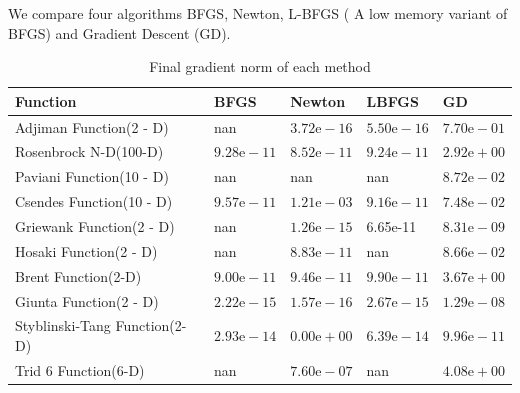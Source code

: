 \documentclass[12pt]{report}
\begin{document}
We compare four algorithms BFGS, Newton, L-BFGS ( A low memory variant of BFGS) and Gradient Descent (GD).
\begin{table}[htpb]
	\centering
	\caption{Final gradient norm of each method}
	\label{tab:label}
	\begin{tabular}{lllll}
		\toprule
		Function                      & BFGS                 & Newton               & LBFGS                & GD                   \\
		\midrule
		Adjiman Function(2 - D)       & nan                  & $3.72 \mathrm{e}-16$ & $5.50 \mathrm{e}-16$ & $7.70 \mathrm{e}-01$ \\
		Rosenbrock N-D(100-D)         & $9.28 \mathrm{e}-11$ & $8.52 \mathrm{e}-11$ & $9.24 \mathrm{e}-11$ & $2.92 \mathrm{e}+00$ \\
		Paviani Function(10 - D)      & nan                  & nan                  & nan                  & $8.72 \mathrm{e}-02$ \\
		Csendes Function(10 - D)      & $9.57 \mathrm{e}-11$ & $1.21 \mathrm{e}-03$ & $9.16 \mathrm{e}-11$ & $7.48 \mathrm{e}-02$ \\
		Griewank Function(2 - D)      & nan                  & $1.26 \mathrm{e}-15$ & 6.65e-11             & $8.31 \mathrm{e}-09$ \\
		Hosaki Function(2 - D)        & nan                  & $8.83 \mathrm{e}-11$ & nan                  & $8.66 \mathrm{e}-02$ \\
		Brent Function(2-D)           & $9.00 \mathrm{e}-11$ & $9.46 \mathrm{e}-11$ & $9.90 \mathrm{e}-11$ & $3.67 \mathrm{e}+00$ \\
		Giunta Function(2 - D)        & $2.22 \mathrm{e}-15$ & $1.57 \mathrm{e}-16$ & $2.67 \mathrm{e}-15$ & $1.29 \mathrm{e}-08$ \\
		Styblinski-Tang Function(2-D) & $2.93 \mathrm{e}-14$ & $0.00 \mathrm{e}+00$ & $6.39 \mathrm{e}-14$ & $9.96 \mathrm{e}-11$ \\
		Trid 6 Function(6-D)          & nan                  & $7.60 \mathrm{e}-07$ & nan                  & $4.08 \mathrm{e}+00$ \\
		\bottomrule
	\end{tabular}
\end{table}
\end{document}
